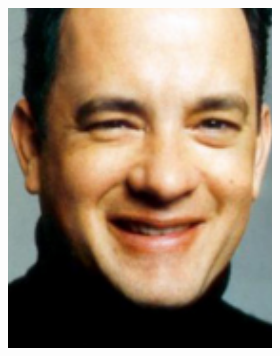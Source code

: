\begin{figure}
\begin{subfigure}{0.23\textwidth}
        \includegraphics[width=\textwidth]{statistical_normals/images/gsfs_results/celebrities/tom_hanks.png}
\label{fig:tom-hanks-input}
    \end{subfigure}
    \begin{subfigure}{0.23\textwidth}
        \centering

\end{subfigure}
\end{figure}
